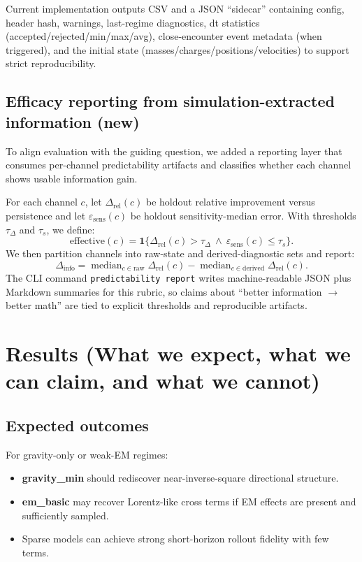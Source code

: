 \documentclass[11pt]{article}
\begin{document}
Current implementation outputs CSV and a JSON ``sidecar'' containing config, header hash, warnings, last-regime diagnostics, dt statistics (accepted/rejected/min/max/avg), close-encounter event metadata (when triggered), and the initial state (masses/charges/positions/velocities) to support strict reproducibility.

\subsection{Efficacy reporting from simulation-extracted information (new)}
To align evaluation with the guiding question, we added a reporting layer that consumes per-channel predictability artifacts and classifies whether each channel shows usable information gain.

For each channel $c$, let $\Delta_{\mathrm{rel}}(c)$ be holdout relative improvement versus persistence and let $\varepsilon_{\mathrm{sens}}(c)$ be holdout sensitivity-median error. With thresholds $\tau_\Delta$ and $\tau_s$, we define:
\begin{equation*}
\mathrm{effective}(c)=\mathbf{1}\{\Delta_{\mathrm{rel}}(c)>\tau_\Delta \ \wedge \ \varepsilon_{\mathrm{sens}}(c)\le\tau_s\}.
\end{equation*}
We then partition channels into raw-state and derived-diagnostic sets and report:
\begin{equation*}
\Delta_{\mathrm{info}}=\operatorname{median}_{c\in\mathrm{raw}}\Delta_{\mathrm{rel}}(c)-\operatorname{median}_{c\in\mathrm{derived}}\Delta_{\mathrm{rel}}(c).
\end{equation*}
The CLI command \texttt{predictability report} writes machine-readable JSON plus Markdown summaries for this rubric, so claims about ``better information $\rightarrow$ better math'' are tied to explicit thresholds and reproducible artifacts.

\section{Results (What we expect, what we can claim, and what we cannot)}
\subsection{Expected outcomes}
For gravity-only or weak-EM regimes:
\begin{itemize}
\item \textbf{gravity\_min} should rediscover near-inverse-square directional structure.
\item \textbf{em\_basic} may recover Lorentz-like cross terms if EM effects are present and sufficiently sampled.
\item Sparse models can achieve strong short-horizon rollout fidelity with few terms.
\end{itemize}
\end{document}
